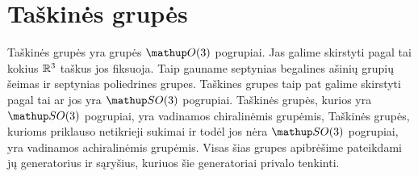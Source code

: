 
\section{Taškinės grupės}

Taškinės grupės yra grupės $\Orth3$ pogrupiai.
Jas galime skirstyti pagal tai kokius $\mathbb{R}^3$ taškus jos fiksuoja.
Taip gauname septynias begalines ašinių grupių šeimas
ir septynias poliedrines grupes. 
Taškines grupes taip pat galime skirstyti pagal tai ar jos yra $\SO3$ pogrupiai.
Taškinės grupės, kurios yra $\SO3$ pogrupiai, yra vadinamos chiralinėmis grupėmis,
Taškinės grupės, kurioms priklauso netikrieji sukimai ir todėl jos nėra $\SO3$ pogrupiai,
yra vadinamos achiralinėmis grupėmis.
Visas šias grupes apibrėšime pateikdami jų generatorius ir sąryšius,
kuriuos šie generatoriai privalo tenkinti. 






\clearpage{}
